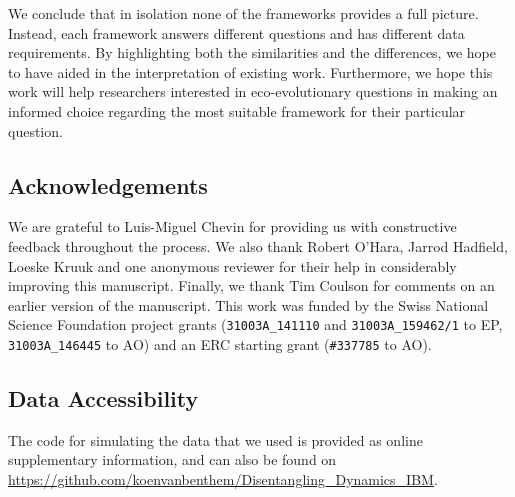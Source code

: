 We conclude that in isolation none of the frameworks provides a full picture. Instead, each framework answers different questions and has different data requirements. By highlighting both the similarities and the differences, we hope to have aided in the interpretation of existing work. Furthermore, we hope this work will help researchers interested in eco-evolutionary questions in making an informed choice regarding the most suitable framework for their particular question.

\subsection*{Acknowledgements}
We are grateful to Luis-Miguel Chevin for providing us with constructive feedback throughout the process. We also thank Robert O'Hara, Jarrod Hadfield, Loeske Kruuk and one anonymous reviewer for their help in considerably improving this manuscript. Finally, we thank Tim Coulson for comments on an earlier version of the manuscript.  This work was funded by the Swiss National Science Foundation project grants (\verb|31003A_141110| and \verb|31003A_159462/1| to EP, \verb|31003A_146445| to AO) and an ERC starting grant (\verb|#337785| to AO).

\subsection*{Data Accessibility}
The code for simulating the data that we used is provided as online supplementary information, and can also be found on  \url{https://github.com/koenvanbenthem/Disentangling_Dynamics_IBM}. 
\printbibliography[heading=subbibliography]

